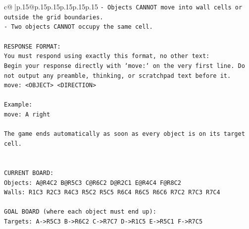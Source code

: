 \documentclass{article}
\begin{document}
{\begin{supertabular}{c@{$\;$}|p{.15\linewidth}@{}p{.15\linewidth}p{.15\linewidth}p{.15\linewidth}p{.15\linewidth}p{.15\linewidth}}
{{{\texttt{{-} Objects CANNOT move into wall cells or outside the grid boundaries.} \\
\texttt{{-} Two objects CANNOT occupy the same cell.} \\
\\ 
\texttt{RESPONSE FORMAT:} \\
\texttt{You must respond using exactly this format, no other text:} \\
\texttt{Begin your response directly with `move:` on the very first line. Do not output any preamble, thinking, or scratchpad text before it.} \\
\texttt{move: <OBJECT> <DIRECTION>} \\
\\ 
\texttt{Example:} \\
\texttt{move: A right} \\
\\ 
\texttt{The game ends automatically as soon as every object is on its target cell.} \\
\\ 
\\ 
\texttt{CURRENT BOARD:} \\
\texttt{Objects: A@R4C2 B@R5C3 C@R6C2 D@R2C1 E@R4C4 F@R8C2} \\
\texttt{Walls: R1C3 R2C3 R4C3 R5C2 R5C5 R6C4 R6C5 R6C6 R7C2 R7C3 R7C4} \\
\\ 
\texttt{GOAL BOARD (where each object must end up):} \\
\texttt{Targets: A{-}>R5C3 B{-}>R6C2 C{-}>R7C7 D{-}>R1C5 E{-}>R5C1 F{-}>R7C5} \\
            }
        }
    }
     \\ \\


\end{supertabular}}
\end{document}
